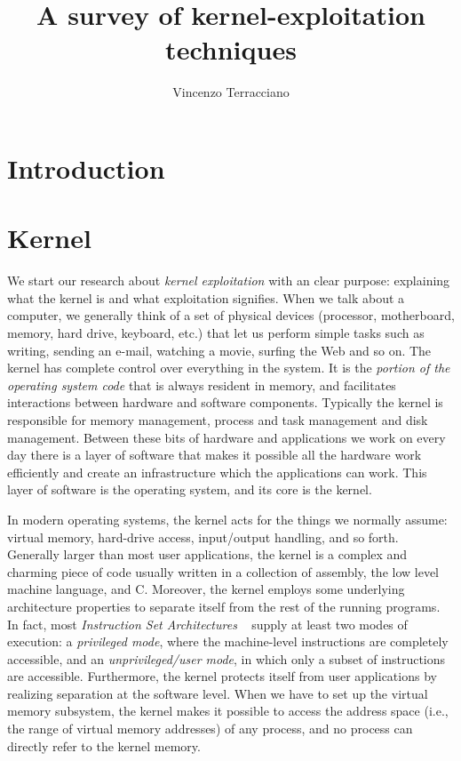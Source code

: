 \documentclass{masterthesis}
\begin{document}
\title{A survey of kernel-exploitation techniques}

\author{Vincenzo Terracciano}



\maketitle

\tableofcontents

\chapter{Introduction}

\chapter{Kernel}
\label{ch:kernel}

We start our research about \emph{kernel exploitation} with an clear purpose: explaining what the kernel is and what exploitation signifies.
When we talk about a computer, we generally think of a set of physical devices (processor, motherboard, memory, hard drive, keyboard, etc.) that let us  perform simple tasks such as writing, sending an e-mail, watching a movie, surfing the Web and so on.
The kernel has complete control over everything in the system. It is the \emph{portion of the operating system code} that is always resident in memory, and facilitates interactions between hardware and software components.
Typically the kernel is responsible for memory management, process and task management and disk management.
Between these bits of hardware and applications we work on every day there is a layer of software that makes it possible all the hardware work efficiently and create an infrastructure which the applications can work.
This layer of software is the operating system, and its core is the kernel.

In modern operating systems, the kernel acts for the things we normally assume: virtual memory, hard-drive access, input/output handling, and so forth. Generally larger than most user applications, the kernel is a complex and charming piece of code usually written in a collection of assembly, the low level machine language, and C.
Moreover, the kernel employs some underlying architecture properties to separate itself from the rest of the running programs.
In fact, most \emph{Instruction Set Architectures} ~\cite{silberman1993architectural} supply at least two modes of execution: a \emph{privileged mode}, where the machine-level instructions are completely accessible, and an \emph{unprivileged/user mode}, in which only a subset of instructions are accessible.
Furthermore, the kernel protects itself from user applications by realizing separation at the software level.
When we have to set up the virtual memory subsystem, the kernel makes it possible to access the address space (i.e., the range of virtual memory addresses) of any process, and no process can directly refer to the kernel memory.\\
\end{document}

